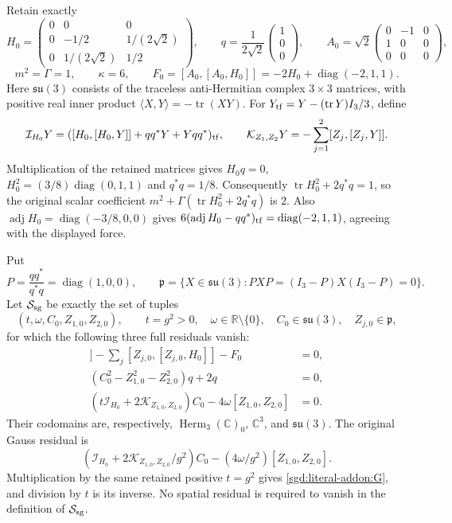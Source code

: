 Retain exactly
\[
 H_0=\begin{pmatrix}0&0&0\\0&-1/2&1/(2\sqrt2)\\
 0&1/(2\sqrt2)&1/2\end{pmatrix},\qquad
 q=\frac1{2\sqrt2}\begin{pmatrix}1\\0\\0\end{pmatrix},\qquad
 A_0=\sqrt2\begin{pmatrix}0&-1&0\\1&0&0\\0&0&0\end{pmatrix},
\]
\[
 m^2=\Gamma=1,\qquad \kappa=6,\qquad
 F_0=[A_0,[A_0,H_0]]=-2H_0+\operatorname{diag}(-2,1,1).
\]
Here $\mathfrak{su}(3)$ consists of the traceless anti-Hermitian complex
$3\times3$ matrices, with positive real inner product
$\langle X,Y\rangle=-\operatorname{tr}(XY)$.
For $Y_{\rm tf}=Y-(\operatorname{tr}Y)I_3/3$, define
\[
 \mathcal I_{H_0}Y
 =([H_0,[H_0,Y]]+qq^*Y+Yqq^*)_{\rm tf},\qquad
 \mathcal K_{Z_1,Z_2}Y=-\sum_{j=1}^2[Z_j,[Z_j,Y]].
\]
Multiplication of the retained matrices gives
$H_0q=0$, $H_0^2=(3/8)\operatorname{diag}(0,1,1)$ and $q^*q=1/8$.
Consequently $\operatorname{tr}H_0^2+2q^*q=1$, so the original
scalar coefficient $m^2+\Gamma(\operatorname{tr}H_0^2+2q^*q)$ is $2$.
Also $\operatorname{adj}H_0=\operatorname{diag}(-3/8,0,0)$ gives
$6(\operatorname{adj}H_0-qq^*)_{\rm tf}
=\operatorname{diag}(-2,1,1)$, agreeing with the displayed force.

Put
\[
 P=\frac{qq^*}{q^*q}=\operatorname{diag}(1,0,0),\qquad
 \mathfrak p=\{X\in\mathfrak{su}(3):
 PXP=(I_3-P)X(I_3-P)=0\}.
\]
Let $\mathcal S_{\rm sg}$ be exactly the set of tuples
\[
 (t,\omega,C_0,Z_{1,0},Z_{2,0}),\qquad
 t=g^2>0,\quad \omega\in\mathbb R\setminus\{0\},\quad
 C_0\in\mathfrak{su}(3),\quad Z_{j,0}\in\mathfrak p,
\]
for which the following three full residuals vanish:
\begin{align}
 [C_0,[C_0,H_0]]
 -\sum_j[Z_{j,0},[Z_{j,0},H_0]]-F_0&=0,
 \label{sgd:literal-addon:H}\\
 (C_0^2-Z_{1,0}^2-Z_{2,0}^2)q+2q&=0,
 \label{sgd:literal-addon:q}\\
 (t\mathcal I_{H_0}+2\mathcal K_{Z_{1,0},Z_{2,0}})C_0
 -4\omega[Z_{1,0},Z_{2,0}]&=0.
 \label{sgd:literal-addon:G}
\end{align}
Their codomains are, respectively,
$\operatorname{Herm}_3(\mathbb C)_0$, $\mathbb C^3$, and
$\mathfrak{su}(3)$. The original Gauss residual is
\[
 (\mathcal I_{H_0}+2\mathcal K_{Z_{1,0},Z_{2,0}}/g^2)C_0
 -(4\omega/g^2)[Z_{1,0},Z_{2,0}].
\]
Multiplication by the same retained positive $t=g^2$ gives
\eqref{sgd:literal-addon:G}, and division by $t$ is its inverse.
No spatial residual is required to vanish in the definition of
$\mathcal S_{\rm sg}$.

